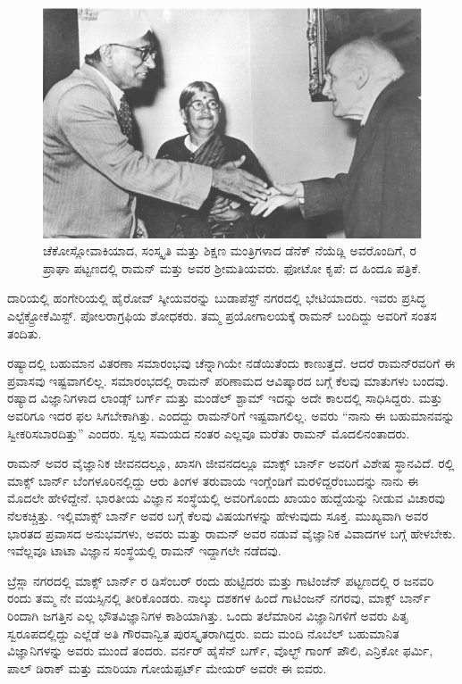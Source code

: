 \begin{figure}[!b]
\centering
\includegraphics[scale=0.225]{"images/9.jpg"}
\caption{ಚೆಕೋಸ್ಲೋವಾಕಿಯಾದ, ಸಂಸ್ಕೃತಿ ಮತ್ತು ಶಿಕ್ಷಣ ಮಂತ್ರಿಗಳಾದ ಡೆನೆಕ್ ನೆಯೆಡ್ಲಿ ಅವರೊಂದಿಗೆ, ರ ಪ್ರಾಘಾ ಪಟ್ಟಣದಲ್ಲಿ ರಾಮನ್ ಮತ್ತು ಅವರ ಶ‍್ರೀಮತಿಯವರು. ಫೋಟೋ ಕೃಪೆ: ದ ಹಿಂದೂ ಪತ್ರಿಕೆ.}\label{chap3-fig02}
\end{figure}

ದಾರಿಯಲ್ಲಿ ಹಂಗೇರಿಯಲ್ಲಿ ಹೈರೋವ್ ಸ್ಕೀಯವರನ್ನು ಬುಡಾಪೆಸ್ಟ್ ನಗರದಲ್ಲಿ ಭೇಟಿಯಾದರು. ಇವರು ಪ್ರಸಿದ್ಧ ಎಲ್ಟೆಕ್ಟ್ರೋಕೆಮಿಸ್ಟ್. ಪೋಲರಾಗ್ರಫಿಯ ಶೋಧಕರು. ತಮ್ಮ ಪ್ರಯೋಗಾಲಯಕ್ಕೆ ರಾಮನ್ ಬಂದಿದ್ದು ಅವರಿಗೆ ಸಂತಸ ತಂದಿತು.

ರಷ್ಯಾದಲ್ಲಿ ಬಹುಮಾನ ವಿತರಣಾ ಸಮಾರಂಭವು ಚೆನ್ನಾಗಿಯೇ ನಡೆಯಿತೆಂದು ಕಾಣುತ್ತದೆ. ಆದರೆ ರಾಮನ್‍ರವರಿಗೆ ಈ ಪ್ರವಾಸವು ಇಷ್ಟವಾಗಲಿಲ್ಲ. ಸಮಾರಂಭದಲ್ಲಿ ರಾಮನ್ ಪರಿಣಾಮದ ಆವಿಷ್ಕಾರದ ಬಗ್ಗೆ ಕೆಲವು ಮಾತುಗಳು ಬಂದವು. ರಷ್ಯಾದ ವಿಜ್ಞಾನಿಗಳಾದ ಲಾಂಡ್ಸ್ ಬರ್ಗ್ ಮತ್ತು ಮಂಡೆಲ್ ಶ್ಟಾಮ್ ಇದನ್ನು ಅದೇ ಕಾಲದಲ್ಲಿ ಸಾಧಿಸಿದ್ದರು. ಮತ್ತು ಅವರಿಗೂ ಇದರ ಫಲ ಸಿಗಬೇಕಾಗಿತ್ತು. ಎಂದದ್ದು ರಾಮನ್‍ರಿಗೆ ಇಷ್ಟವಾಗಲಿಲ್ಲ. ಅವರು “ನಾನು ಈ ಬಹುಮಾನವನ್ನು ಸ್ವೀಕರಿಸಬಾರದಿತ್ತು” ಎಂದರು. ಸ್ವಲ್ಪ ಸಮಯದ ನಂತರ ಎಲ್ಲವೂ ಮರೆತು ರಾಮನ್ ಮೊದಲಿನಂತಾದರು.



ರಾಮನ್ ಅವರ ವೈಜ್ಞಾನಿಕ ಜೀವನದಲ್ಲೂ, ಖಾಸಗಿ ಜೀವನದಲ್ಲೂ ಮಾಕ್ಸ್ ಬಾರ್ನ್ ಅವರಿಗೆ ವಿಶೇಷ ಸ್ಥಾನವಿದೆ. ರಲ್ಲಿ ಮಾಕ್ಸ್ ಬಾರ್ನ್ ಬೆಂಗಳೂರಿನಲ್ಲಿದ್ದು ಆರು ತಿಂಗಳ ತರುವಾಯ ಇಂಗ್ಲೆಂಡಿಗೆ ಮರಳಿದ್ದರೆಂಬುದನ್ನು ನಾನು ಈ ಮೊದಲೇ ಹೇಳಿದ್ದೇನೆ. ಭಾರತೀಯ ವಿಜ್ಞಾನ ಸಂಸ್ಥೆಯಲ್ಲಿ ಅವರಿಗೊಂದು ಖಾಯಂ ಹುದ್ದೆಯನ್ನು ನೀಡುವ ವಿಚಾರವು ನೆಲಕಚ್ಚಿತ್ತು. ಇಲ್ಲಿ\break ಮಾಕ್ಸ್ ಬಾರ್ನ್ ಅವರ ಬಗ್ಗೆ ಕೆಲವು ವಿಷಯಗಳನ್ನು ಹೇಳುವುದು ಸೂಕ್ತ. ಮುಖ್ಯವಾಗಿ ಅವರ ಭಾರತದ ಪ್ರವಾಸದ ಅನುಭವಗಳು, ಅವರು ಮತ್ತು ರಾಮನ್ ಅವರ ನಡುವೆ ವೈಜ್ಞಾನಿಕ ವಿವಾದಗಳ ಬಗ್ಗೆ ಹೇಳಬೇಕು. ಇವೆಲ್ಲವೂ ಟಾಟಾ ವಿಜ್ಞಾನ ಸಂಸ್ಥೆಯಲ್ಲಿ ರಾಮನ್ ಇದ್ದಾಗಲೇ ನಡೆದವು.

ಬ್ರೆಸ್ಲಾ ನಗರದಲ್ಲಿ ಮಾಕ್ಸ್ ಬಾರ್ನ್ ರ ಡಿಸೆಂಬರ್  ರಂದು ಹುಟ್ಟಿದರು ಮತ್ತು ಗಾಟಿಂಜೆನ್ ಪಟ್ಟಣದಲ್ಲಿ ರ ಜನವರಿ  ರಂದು ತಮ್ಮ ನೇ ವಯಸ್ಸಿನಲ್ಲಿ ತೀರಿಕೊಂಡರು. ನಾಲ್ಕು ದಶಕಗಳ ಹಿಂದೆ ಗಾಟಿಂಜನ್ ನಗರವು, ಮಾಕ್ಸ್ ಬಾರ್ನ್ ರಿಂದಾಗಿ ಜಗತ್ತಿನ ಎಲ್ಲ ಭೌತವಿಜ್ಞಾನಿಗಳ ಕಾಶಿಯಾಗಿತ್ತು. ಒಂದು ತಲೆಮಾರಿನ ವಿಜ್ಞಾನಿಗಳಿಗೆ ಅವರು ಪಿತೃ ಸ್ವರೂಪದಲ್ಲಿದ್ದು ಎಲ್ಲೆಡೆ ಅತಿ ಗೌರವಾನ್ವಿತ ಪುರಸ್ಕೃತರಾಗಿದ್ದರು. ಐದು ಮಂದಿ ನೊಬೆಲ್ ಬಹುಮಾನಿತ ವಿಜ್ಞಾನಿಗಳನ್ನು ಅವರು ಮುಂದೆ ತಂದರು. ವರ್ನರ್ ಹೈಸೆನ್ ಬರ್ಗ್, ವೊಲ್ಛ್ ಗಾಂಗ್ ಪೌಲಿ, ಎನ್ರಿಕೋ ಫರ್ಮಿ, ಪಾಲ್ ಡಿರಾಕ್ ಮತ್ತು ಮಾರಿಯಾ ಗೋಯೆಪ್ಪರ್ಟ್ ಮೇಯರ್ ಅವರೇ ಈ ಐವರು.


